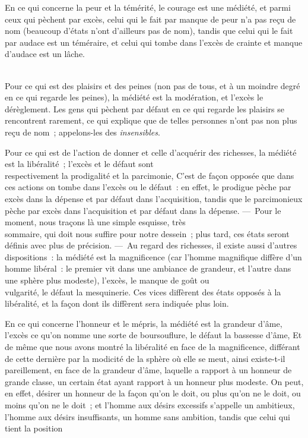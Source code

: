 \documentclass[french,twoside]{book} %
\begin{document}
\noindent  En ce qui concerne la peur et la témérité, le courage est une médiété, et parmi ceux qui pèchent par excès, celui qui le fait par manque de peur n’a pas reçu de nom (beaucoup d’états n’ont d’ailleurs pas de nom), tandis que celui qui le fait par audace est un téméraire, et celui qui tombe dans l’excès de crainte et manque d’audace est un lâche.\par
\\
Pour ce qui est des plaisirs et des peines (non pas de tous, et à un moindre degré en ce qui regarde les peines), la médiété est la modération, et l’excès le dérèglement. Les gens qui pèchent par défaut en ce qui regarde les plaisirs se rencontrent rarement, ce qui explique que de telles personnes n’ont pas non plus reçu de nom ; appelons-les des {\itshape insensibles}.\par
Pour ce qui est de l’action de donner et celle d’acquérir des richesses, la médiété est la libéralité ; l’excès et le défaut sont \\
respectivement la prodigalité et la parcimonie, C’est de façon opposée que dans ces actions on tombe dans l’excès ou le défaut : en effet, le prodigue pèche par excès dans la dépense et par défaut dans l’acquisition, tandis que le parcimonieux pèche par excès dans l’acquisition et par défaut dans la dépense. — Pour le moment, nous traçons là une simple esquisse, très \\
sommaire, qui doit nous suffire pour notre dessein ; plus tard, ces états seront définis avec plus de précision. — Au regard des richesses, il existe aussi d’autres dispositions : la médiété est la magnificence (car l’homme magnifique diffère d’un homme libéral : le premier vit dans une ambiance de grandeur, et l’autre dans une sphère plus modeste), l’excès, le manque de goût ou \\
vulgarité, le défaut la mesquinerie. Ces vices diffèrent des états opposés à la libéralité, et la façon dont ils diffèrent sera indiquée plus loin.\par
En ce qui concerne l’honneur et le mépris, la médiété est la grandeur d’âme, l’excès ce qu’on nomme une sorte de boursouflure, le défaut la bassesse d’âme, Et de même que nous avons montré la libéralité en face de la magnificence, différant \\
de cette dernière par la modicité de la sphère où elle se meut, ainsi existe-t-il pareillement, en face de la grandeur d’âme, laquelle a rapport à un honneur de grande classe, un certain état ayant rapport à un honneur plus modeste. On peut, en effet, désirer un honneur de la façon qu’on le doit, ou plus qu’on ne le doit, ou moins qu’on ne le doit ; et l’homme aux désirs excessifs s’appelle un ambitieux, l’homme aux désirs insuffisants, un homme sans ambition, tandis que celui qui tient la position \\
\end{document}
